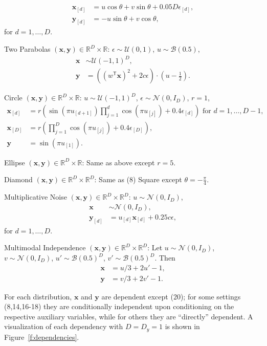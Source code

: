 \documentclass[11pt]{article}
\providecommand{\mb}[1]{\boldsymbol{#1}}
\providecommand{\mc}[1]{\mathcal{#1}}
\newcommand{\Real}{\mathbb{R}}
\newcommand{\T}{^{\ensuremath{\mathsf{T}}}}           %
\newcommand{\mby}{\ensuremath{\mb{y}}}
\begin{document}
\begin{compactenum}
\begin{align*}
\mb{x}_{[d]}&=u \cos\theta + v \sin\theta + 0.05 D\epsilon_{[d]},\\
\mb{y}_{[d]}&=-u \sin\theta + v \cos\theta,
\end{align*}
for $d=1,\ldots,D$.
\item Two Parabolas $(\mb{x},\mb{y}) \in \Real^{D} \times \Real$: $\epsilon \sim \mc{U}(0,1)$, $u \sim \mc{B}(0.5)$,
\begin{align*}
\mb{x} &\sim \mc{U}(-1,1)^{D},\\
\mb{y}&=\left( (w\T \mb{x})^2  + 2c\epsilon\right) \cdot (u-\tfrac{1}{2}).
\end{align*}
\item Circle $(\mb{x},\mb{y}) \in \Real^{D} \times \Real$: $u \sim \mc{U}(-1,1)^{D}$, $\epsilon \sim \mc{N}(0, I_{D})$, $r=1$,
\begin{align*}
\mb{x}_{[d]}&=r \left(\sin(\pi u_{[d+1]})  \prod_{j=1}^{d} \cos(\pi u_{[j]})+0.4 \epsilon_{[d]}\right) \mbox{ for $d=1,\ldots,D-1$},\\
\mb{x}_{[D]}&=r \left(\prod_{j=1}^{D} \cos(\pi u_{[j]})+0.4 \epsilon_{[D]}\right),\\
\mb{y}&= \sin(\pi u_{[1]}).
\end{align*}
\item Ellipse $(\mb{x},\mb{y}) \in \Real^{D} \times \Real$: Same as above except $r=5$.
\item Diamond $(\mb{x},\mb{y}) \in \Real^{D} \times \Real^{D}$: Same as (8) Square except $\theta=-\frac{\pi}{4}$.
\item Multiplicative Noise $(\mb{x},\mb{y}) \in \Real^{D} \times \Real^{D}$: $u \sim \mc{N}(0, I_{D})$, 
\begin{align*}
\mb{x} &\sim \mc{N}(0, I_{D}),\\
\mb{y}_{[d]}&=u_{[d]}\mb{x}_{[d]}+0.25 c\epsilon,
\end{align*}
for $d=1,\ldots,D$.
\item Multimodal Independence $(\mb{x},\mb{y}) \in \Real^{D} \times \Real^{D}$: Let $u \sim \mc{N}(0,I_{D})$, $v \sim \mc{N}(0,I_{D})$, $u' \sim \mc{B}(0.5)^{D}$, $v' \sim \mc{B}(0.5)^{D}$. Then
\begin{align*}
\mb{x}&=u/3+2u'-1,\\
\mb{y}&=v/3+2v'-1.
\end{align*}
\end{compactenum}

For each distribution, $\mb{x}$ and $\mb{y}$ are dependent except  (20); for some settings (8,14,16-18) they are conditionally independent upon conditioning on the respective auxiliary variables, while for others they are
 ``directly'' dependent. 
A visualization of each dependency with $D=D_y=1$ is shown in Figure~\ref{f:dependencies}.
\end{document}
